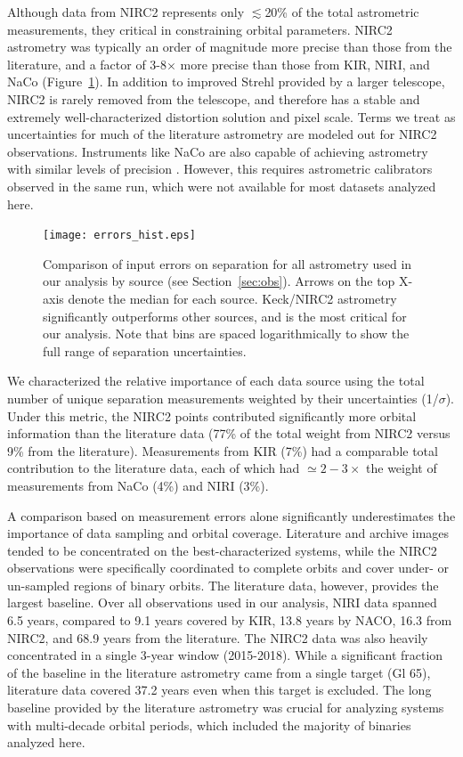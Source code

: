 \documentclass[twocolumn]{aastex62}
\begin{document}
Although data from NIRC2 represents only $\lesssim$20\% of the total astrometric measurements, they critical in constraining orbital parameters. NIRC2 astrometry was typically an order of magnitude more precise than those from the literature, and a factor of 3-8$\times$ more precise than those from KIR, NIRI, and NaCo (Figure~\ref{fig:errors}). In addition to improved Strehl provided by a larger telescope, NIRC2 is rarely removed from the telescope, and therefore has a stable and extremely well-characterized distortion solution and pixel scale. Terms we treat as uncertainties for much of the literature astrometry are modeled out for NIRC2 observations. Instruments like NaCo are also capable of achieving astrometry with similar levels of precision \citep[e.g.,][]{Reggiani2016}. However, this requires astrometric calibrators observed in the same run, which were not available for most datasets analyzed here.

\begin{figure}[htb]
\begin{center}
\texttt{[image: errors\_hist.eps]}
\caption{Comparison of input errors on separation for all astrometry used in our analysis by source (see Section~\ref{sec:obs}). Arrows on the top X-axis denote the median for each source. Keck/NIRC2 astrometry significantly outperforms other sources, and is the most critical for our analysis. Note that bins are spaced logarithmically to show the full range of separation uncertainties. }
\label{fig:errors}
\end{center}
\end{figure}

We characterized the relative importance of each data source using the total number of unique separation measurements weighted by their uncertainties (1/$\sigma$). Under this metric, the NIRC2 points contributed significantly more orbital information than the literature data (77\% of the total weight from NIRC2 versus 9\% from the literature). Measurements from KIR (7\%) had a comparable total contribution to the literature data, each of which had $\simeq2-3\times$ the weight of measurements from NaCo (4\%) and NIRI (3\%). 

 A comparison based on measurement errors alone significantly underestimates the importance of data sampling and orbital coverage. Literature and archive images tended to be concentrated on the best-characterized systems, while the NIRC2 observations were specifically coordinated to complete orbits and cover under- or un-sampled regions of binary orbits. The literature data, however, provides the largest baseline. Over all observations used in our analysis, NIRI data spanned 6.5 years, compared to 9.1 years covered by KIR, 13.8 years by NACO, 16.3 from NIRC2, and 68.9 years from the literature. The NIRC2 data was also heavily concentrated in a single 3-year window (2015-2018). While a significant fraction of the baseline in the literature astrometry came from a single target (Gl 65), literature data covered 37.2 years even when this target is excluded. The long baseline provided by the literature astrometry was crucial for analyzing systems with multi-decade orbital periods, which included the majority of binaries analyzed here.
\end{document}

